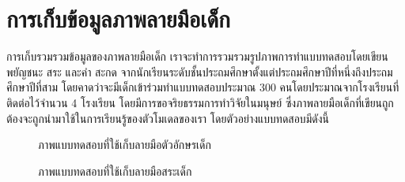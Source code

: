 \documentclass[12pt,oneside,openright,a4paper]{cpe-thai-project}
\begin{document}
\section{การเก็บข้อมูลภาพลายมือเด็ก}
การเก็บรวมรวมข้อมูลของภาพลายมือเด็ก เราจะทำการรวมรวมรูปภาพการทำแบบทดสอบโดยเขียนพยัญชนะ สระ และคำ สะกด จากนักเรียนระดับชั้นประถมศึกษาตั้งแต่ประถมศึกษาปีที่หนึ่งถึงประถมศึกษาปีที่สาม 
โดยคาดว่าจะมีเด็กเข้าร่วมทำแบบทดสอบประมาณ 300 คนโดยประมาณจากโรงเรียนที่ติดต่อไว้จำนวน 4 โรงเรียน โดยมีการขอจริยธรรมการทำวิจัยในมนุษย์ 
ซึ่งภาพลายมือเด็กที่เขียนถูกต้องจะถูกนำมาใช้ในการเรียนรู้ของตัวโมเดลของเรา โดยตัวอย่างแบบทดสอบมีดังนี้ 
\begin{figure}[!ht]\centering
  \setlength{\fboxrule}{0.2mm} %
  \setlength{\fboxsep}{1cm}
  \caption{ภาพแบบทดสอบที่ใช้เก็บลายมือตัวอักษรเด็ก}\label{fig:system}
    
\end{figure}
\newpage
\begin{figure}[!ht]\centering
  \setlength{\fboxrule}{0.2mm} %
  \setlength{\fboxsep}{1cm}
  \caption{ภาพแบบทดสอบที่ใช้เก็บลายมือสระเด็ก}\label{fig:system}
    
\end{figure}
\end{document}
